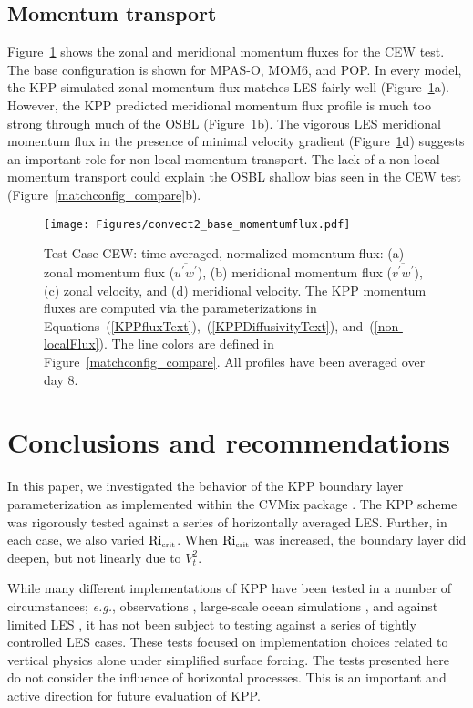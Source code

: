 \documentclass[preprint,12pt,authoryear]{agujournal}
\begin{document}
\subsection{Momentum transport}
\label{section:results-momentumtrans}

Figure~\ref{convect2_momentumFlux} shows the zonal and meridional momentum fluxes for the CEW test.  The base configuration is shown for MPAS-O, MOM6, and POP.  In every model, the KPP simulated zonal momentum flux matches LES fairly well (Figure~\ref{convect2_momentumFlux}a).  However, the KPP predicted meridional momentum flux profile is much too strong through much of the OSBL (Figure~\ref{convect2_momentumFlux}b).  The vigorous LES meridional momentum flux in the presence of minimal velocity gradient (Figure~\ref{convect2_momentumFlux}d) suggests an important role for non-local momentum transport.  The lack of a non-local momentum transport could explain the OSBL shallow bias seen in the CEW test (Figure~\ref{matchconfig_compare}b).

\begin{figure}[hbtp]
\centering\texttt{[image: Figures/convect2\_base\_momentumflux.pdf]}
\caption{Test Case CEW: time averaged, normalized momentum flux: (a) zonal momentum flux ($\overline{u^\prime w^\prime}$), (b) meridional momentum flux ($\overline{v^\prime w^\prime}$), (c) zonal velocity, and (d) meridional velocity.  The KPP momentum fluxes are computed via the parameterizations in Equations~(\ref{KPPfluxText}),~(\ref{KPPDiffusivityText}), and~(\ref{non-localFlux}).  The line colors are defined in Figure~\ref{matchconfig_compare}.  All profiles have been averaged over day 8.}
\label{convect2_momentumFlux}
\end{figure}

\section{Conclusions and recommendations}
\label{discussion}

In this paper, we investigated the behavior of the KPP boundary layer parameterization as implemented within the CVMix package \citep{Griffies2015}. The KPP scheme was rigorously tested against a series of horizontally averaged LES.  Further, in each case, we also varied $\mbox{Ri}_{\mbox{\tiny crit}}$.  When $\mbox{Ri}_{\mbox{\tiny crit}}$ was increased, the boundary layer did deepen, but not linearly due to $V_t^2$.  

While many different implementations of KPP have been tested in a number of circumstances; \textit{e.g.}, observations \citep[(\textit{e.g.}, LMD94,][]{Zedler2002,VanRoekel2012,mukherjee2016}, large-scale ocean simulations \citep[\textit{e.g.},][]{Li2001}, and against limited LES \citep[\textit{e.g.},][]{Large1999, McWilliams2000, Smyth2002, noh2016parameterization,Reichl:2016db}, it has not been subject to testing against a series of tightly controlled LES cases.  These tests focused on implementation choices related to vertical physics alone under simplified surface forcing.  The tests presented here do not consider the influence of horizontal processes. This is an important and active \citep{bachman2017parameterization} direction for future evaluation of KPP.
\end{document}

